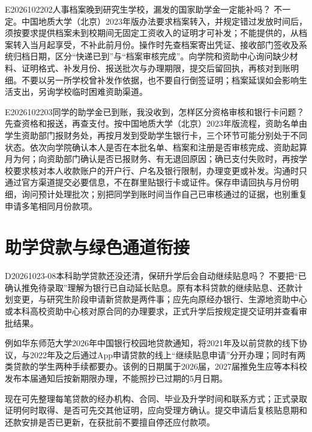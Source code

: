 \begin{qa}{E2026102202}{人事档案晚到研究生学校，漏发的国家助学金一定能补吗？}
不一定。中国地质大学（北京）2023年版办法要求档案转入，并规定错过发放时间后，须按要求提供档案未到校期间无固定工资收入的证明才可补发；不能提供的，从档案转入当月起享受，不补此前月份。操作时先查档案寄出凭证、接收部门签收及系统归档日期，区分“快递已到”与“档案审核完成”。向学院和资助中心询问缺少材料、证明格式、补发月份、报送批次与办理期限，提交后留回执，再核对到账明细。不要以另一所学校曾补发作依据，也不要自行倒签证明；档案延误如会影响生活支出，另询学校临时困难资助渠道。
\end{qa}

\begin{qa}{E2026102203}{同学的助学金已到账，我没收到，怎样区分资格审核和银行卡问题？}
先查资格和报送，再查支付。按中国地质大学（北京）2023年版流程，资助名单由学生资助部门报财务处，再按月发到受助学生银行卡，三个环节可能分别处于不同状态。依次向学院确认本人是否在本批名单、档案和注册是否审核完成、资助起算月为何；向资助部门确认是否已报财务、有无退回原因；确已支付失败时，再按学校要求核对本人收款账户的开户行、户名及银行限制，办理变更或补发。沟通时只通过官方渠道提交必要信息，不在群里贴银行卡或证件。保存申请回执与月份明细，询问预计处理批次；别把同学到账时间当作自己已审核通过的证据，也别重复申请多笔相同月份款项。
\end{qa}

\section{助学贷款与绿色通道衔接}

\begin{qa}{D20261023-08}{本科助学贷款还没还清，保研升学后会自动继续贴息吗？}
不要把“已确认推免待录取”理解为银行已自动延长贴息。原有本科贷款的继续贴息、还款计划变更，与研究生阶段申请新贷款是两件事；应先向原经办银行、生源地资助中心或本科高校资助中心核对原合同的办理要求，正式升学后按规定提交证明并查看审批结果。 

例如华东师范大学2026年中国银行校园地贷款通知，将2021年及以前贷款的线下协议，与2022年及之后通过App申请贷款的线上“继续贴息申请”分开办理；同时有两类贷款的学生两种手续都要办。该例的日期属于2026届，2027届推免生应等本科校发布本届通知后按新期限办理，不能照抄已过期的5月日期。

现在可先整理每笔贷款的经办机构、合同、毕业及升学时间和联系方式；正式录取证明何时取得、是否可先交其他证明，应向受理方确认。提交申请后复核贴息期和还款安排是否已更新，在获批前不要擅自停还应付款项。
\end{qa}

